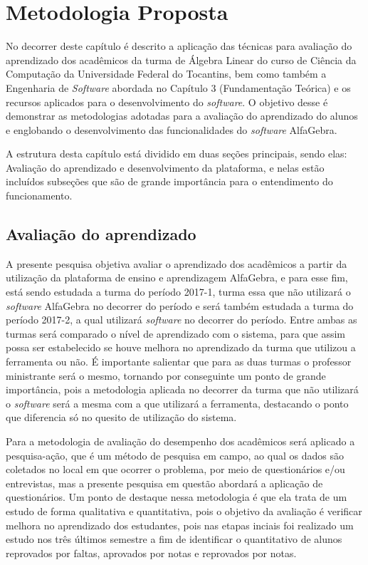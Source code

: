 \chapter{Metodologia Proposta}
\label{cap:metodologia}

\noindent No decorrer deste capítulo é descrito a aplicação das técnicas para avaliação do aprendizado dos acadêmicos da turma de Álgebra Linear do curso de Ciência da Computação da Universidade Federal do Tocantins, bem como também a Engenharia de \textit{Software} abordada no Capítulo 3 (Fundamentação Teórica) e os recursos aplicados para o desenvolvimento do \textit{software}. O objetivo desse é demonstrar as metodologias adotadas para a avaliação do aprendizado do alunos e englobando o desenvolvimento das funcionalidades do \textit{software} AlfaGebra. 

A estrutura desta capítulo está dividido em duas seções principais, sendo elas: Avaliação do aprendizado e desenvolvimento da plataforma, e nelas estão incluídos subseções que são de grande importância para o entendimento do funcionamento.

\section{Avaliação do aprendizado}
\noindent A presente pesquisa objetiva avaliar o aprendizado dos acadêmicos a partir da utilização da plataforma de ensino e aprendizagem AlfaGebra, e para esse fim, está sendo estudada a turma do período 2017-1, turma essa que não utilizará o \textit{software} AlfaGebra no decorrer do período e será também estudada a turma do período 2017-2, a qual utilizará \textit{software} no decorrer do período. Entre ambas as turmas será comparado o nível de aprendizado com o sistema, para que assim possa ser estabelecido se houve melhora no aprendizado da turma que utilizou a ferramenta ou não. É importante salientar que para as duas turmas o professor ministrante será o mesmo, tornando por conseguinte um ponto de grande importância, pois a metodologia aplicada no decorrer da turma que não utilizará o \textit{software} será a mesma com a que utilizará a ferramenta, destacando o ponto que diferencia só no quesito de utilização do sistema.

Para a metodologia de avaliação do desempenho dos acadêmicos será aplicado a pesquisa-ação, que é um método de pesquisa em campo, ao qual os dados são coletados no local em que ocorrer o problema, por meio de questionários e/ou entrevistas, mas a presente pesquisa em questão abordará a aplicação de questionários. Um ponto de destaque nessa metodologia é que ela trata de um estudo de forma qualitativa e quantitativa, pois o objetivo da avaliação é verificar melhora no aprendizado dos estudantes, pois nas etapas inciais foi realizado um estudo nos três últimos semestre a fim de identificar o quantitativo de alunos reprovados por faltas, aprovados por notas e reprovados por notas.

